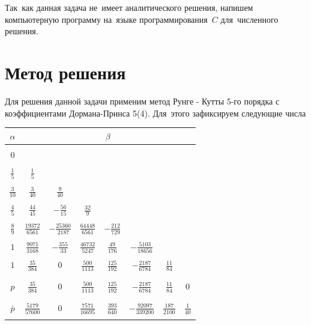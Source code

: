 \documentclass[a4paper,14pt]{article}
\begin{document}
Так~как данная задача не~имеет аналитического решения, напишем компьютерную программу на~языке программирования~$C$ для~численного решения.

\section{Метод решения}
Для решения данной задачи применим метод Рунге - Кутты 5-го порядка с коэффициентами Дормана-Принса 5(4). Для~этого зафиксируем следующие числа 
\begin{center}
\begin{tabular}{|c|ccccccc|}
\hline
{\bf $\alpha$} & \multicolumn{7}{|c|}{{\bf $\beta$}}\\
\hline
    & & & & & & &\\
$0$ & & & & & & & \\ 
    & & & & & & &\\
$\frac{1}{5}$ &$\frac{1}{5}$ & & & & &  &\\
& & & & & &  &\\
$\frac{3}{10}$ &$\frac{3}{40}$ &$\frac{9}{40}$  & & & &  &\\ 
& & & & & &  &\\
$\frac{4}{5}$ &$\frac{44}{45}$ &$-\frac{56}{15}$  &  $\frac{32}{9}$& & & & \\
& & & & & &  &\\
$\frac{8}{9}$ &$\frac{19372}{6561}$ &$-\frac{25360}{2187}$  &  $\frac{64448}{6561}$& $-\frac{212}{729}$ & & & \\
& & & & & & &\\
$1$ &$\frac{9071}{3168}$ &$-\frac{355}{33}$  &  $\frac{46732}{5247}$& $\frac{49}{176}$ &  $-\frac{5103}{18656}$&  &\\
& & & & & & & \\
$1$ &$\frac{35}{384}$ &$0$  &  $\frac{500}{1113}$& $\frac{125}{192}$ &  $-\frac{2187}{6784}$&$\frac{11}{84}$ & \\
& & & & & & & \\
\hline
& & & & & & & \\
$p$ &$\frac{35}{384}$ &$0$  &  $\frac{500}{1113}$& $\frac{125}{192}$ &  $-\frac{2187}{6784}$&$\frac{11}{84}$ & 0 \\
& & & & & & & \\
\hline
& & & & & & & \\
$\bar p$ &$\frac{5179}{57600}$ &$0$  &  $\frac{7571}{16695}$& $\frac{393}{640}$ &  $-\frac{92097}{339200}$&$\frac{187}{2100}$&$\frac{1}{40}$  \\
& & & & & & & \\
\hline
\end{tabular}
\end{center}
\end{document}
